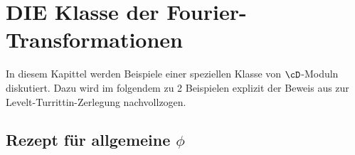 \chapter{DIE Klasse der Fourier-Transformationen}
In diesem Kapittel werden Beispiele einer speziellen Klasse von $\cD$-Moduln
diskutiert. Dazu wird im folgendem zu 2 Beispielen explizit der Beweis aus
\cite{sabbah_cimpa90} zur Levelt-Turrittin-Zerlegung nachvollzogen. 
\begin{comment}
Eine weitere
explizite Berechnung findet sich bei \cite[5.b oder 5.c]{sabbah_cimpa90}.
\end{comment}

\section{Rezept für allgemeine $\phi$} \label{sec:allgemeinProblem}

\begin{comment}
siehe: \cite[5.b]{sabbah_Fourier-local}

bzeug zu $\sE^\phi$??
\end{comment}

\begin{comment}
sei $\phi\in\{\frac{1}{t^k},\frac{1}{t^2}+\frac{1}{t^3},\dots\}$
\begin{enumerate}
\item Starte mit: $P(t,\partial_t):=(\partial_t-\frac{d}{dt}\phi(t)) \cdot
\mbox{Hauptnenner }\in\C[t]<\partial_t>$
\item Furiertrafo: $F_P(z,\partial_z)=P(\partial_z,-z)\in\C[z]<\partial_z>$
\item $x=z^{-1}$ und $\partial_x=-z^2\partial_z$ \\
\[
Q(x,\partial_x):=F_P(x^{-1},-x^2\partial_x)\cdot \mbox{Hauptnenner
}\in\C[x]<\partial_x>
\]

\textbf{Hauptnenner unnötig?!?}
\item Berechne für $Q$ das NP usw...
\end{enumerate}
\end{comment}


